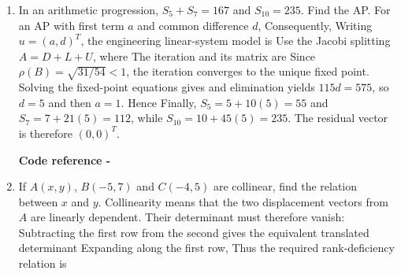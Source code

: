 \begin{enumerate}[label=\thesection.\arabic{subsection}.\arabic{enumi},ref=\arabic{enumi},leftmargin=4mm,itemsep=9pt]
\item \label{question:C10-Q08}\label{question-short:C10-Q08} In an arithmetic progression, $S_5+S_7=167$ and $S_{10}=235$. Find the AP.
\engsolution
For an AP with first term $a$ and common difference $d$,
Consequently,
Writing $u=(a,d)^T$, the engineering linear-system model is
Use the Jacobi splitting $A=D+L+U$, where
The iteration and its matrix are
Since $\rho(B)=\sqrt{31/54}<1$, the iteration converges to the unique fixed point. Solving the fixed-point equations gives
and elimination yields $115d=575$, so $d=5$ and then $a=1$. Hence
Finally, $S_5=5+10(5)=55$ and $S_7=7+21(5)=112$, while $S_{10}=10+45(5)=235$. The residual vector is therefore $(0,0)^T$.
\par\smallskip\noindent\textbf{Code reference -}\par\noindent{}

\item \label{question:C10-Q10}\label{question-short:C10-Q10} If $A(x,y)$, $B(-5,7)$ and $C(-4,5)$ are collinear, find the relation between $x$ and $y$.
\engsolution
Collinearity means that the two displacement vectors from $A$ are linearly dependent. Their determinant must therefore vanish:
Subtracting the first row from the second gives the equivalent translated determinant
Expanding along the first row,
Thus the required rank-deficiency relation is


\end{enumerate}
